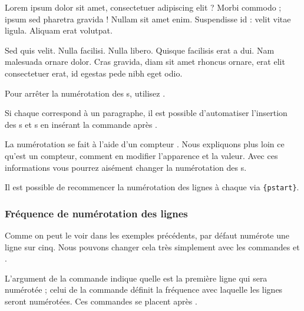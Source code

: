 \begin{minipage}{0.8\textwidth}
\numberpstarttrue
\beginnumbering
\pstart 
Lorem ipsum dolor sit amet, consectetuer adipiscing elit ?
Morbi commodo ; ipsum sed pharetra gravida !
Nullam sit amet enim. Suspendisse id : velit vitae ligula. 
Aliquam erat volutpat. \pend


\pstart Sed quis velit. Nulla facilisi. Nulla libero. 
 Quisque facilisis erat a dui.
Nam malesuada ornare dolor.
Cras gravida, diam sit amet rhoncus ornare, 
erat  elit consectetuer erat, id egestas pede nibh eget odio.
\pend
\endnumbering
\end{minipage}

Pour arrêter la numérotation des s,  utilisez  .

\begin{plusloins}
\label{autopar}Si chaque  correspond à un paragraphe, il est possible d'automatiser l'insertion des s et s en insérant la commande  après .
\end{plusloins}

\begin{plusloins}
La numérotation se fait à l'aide d'un compteur . Nous expliquons plus loin ce qu'est un compteur, comment en modifier l'apparence et la valeur. Avec ces informations vous pourrez aisément changer la numérotation des s.
\end{plusloins}

\begin{plusloins}
Il est possible de recommencer la numérotation des lignes à chaque   via \verb={pstart}=.
\end{plusloins}

\subsubsection{Fréquence de numérotation des lignes}

Comme on peut le voir dans les exemples précédents, par défaut  numérote  une ligne sur cinq. Nous pouvons changer cela très simplement avec les commandes 
 et .

L'argument  de la commande  indique quelle est  la première ligne qui sera numérotée 
; celui de la commande  définit la fréquence avec laquelle les lignes seront numérotées. Ces commandes se placent après . 

